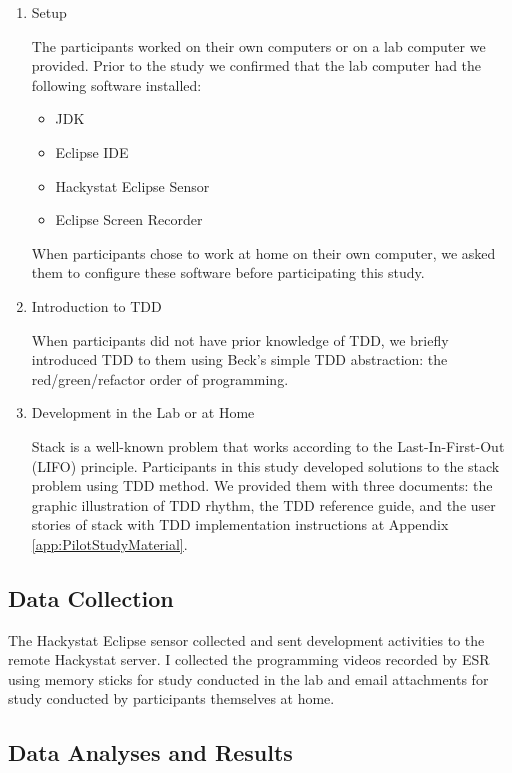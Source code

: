 \begin{enumerate}
\item{Setup} 

The participants worked on their own computers or on a lab computer 
we provided. Prior to the study we confirmed that the lab computer 
had the following software installed: 
  \begin{itemize}
    \item JDK 
    \item Eclipse IDE 
    \item Hackystat Eclipse Sensor \cite{HackystatSensorInstallation:06}
    \item Eclipse Screen Recorder \cite{esr}
  \end{itemize}
When participants chose to work at home on their own computer, we
asked them to configure these software before participating this 
study.

\item{Introduction to TDD}

When participants did not have prior knowledge of TDD, we briefly
introduced TDD to them using Beck's simple TDD abstraction: the 
red/green/refactor order of programming. 

\item{Development in the Lab or at Home} 

Stack is a well-known problem that works according to the 
Last-In-First-Out (LIFO) principle. Participants in this study developed solutions to the stack
problem using TDD method. We provided them with three documents: the
graphic illustration of TDD rhythm, the TDD reference guide, and the
user stories of stack with TDD implementation instructions at Appendix
\ref{app:PilotStudyMaterial}.

\end{enumerate}

\subsection{Data Collection} 

The Hackystat Eclipse sensor collected and sent development activities
to the remote Hackystat server. I collected the programming videos
recorded by ESR using memory sticks for study conducted in the lab and
email attachments for study conducted by participants themselves at
home. 

\subsection{Data Analyses and Results}
